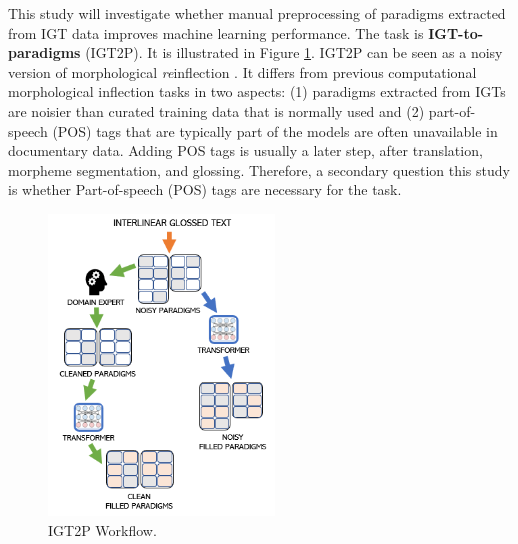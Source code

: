 This study will investigate whether manual preprocessing of paradigms extracted from IGT data improves machine learning performance. The task is \textbf{IGT-to-paradigms} (IGT2P). It is illustrated in Figure \ref{fig:IGT2PWorkflow}. IGT2P can be seen as a noisy version of morphological \textit{re}inflection \citep{cotterell_sigmorphon_2016}. It differs from previous computational morphological inflection tasks \citep{yarowsky-wicentowski-2000-minimally,faruqui-etal-2016-morphological} in two aspects: (1) paradigms extracted from IGTs are noisier than curated training data that is normally used and (2) part-of-speech (POS) tags that are typically part of the models are often unavailable in documentary data. Adding POS tags is usually a later step, after translation, morpheme segmentation, and glossing. Therefore, a secondary question this study is whether Part-of-speech (POS) tags are necessary for the task. 

\begin{figure}[h!]
    \begin{center}
    \includegraphics[width=6cm]{figs/IGT-Paradigm-Workflow.png}
    \caption[IGT2P Workflow]{IGT2P Workflow. 
    }
    \label{fig:IGT2PWorkflow}
    \end{center}
\end{figure}


